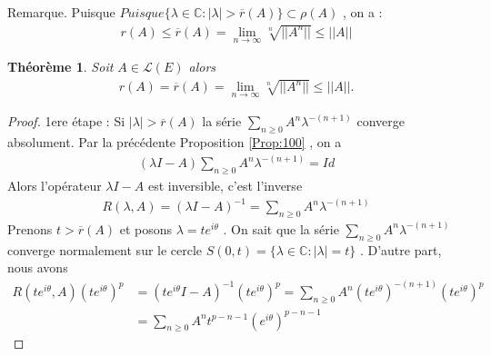 \documentclass{report}
\newtheorem{The}{Théorème}[subsection]
\begin{document}
{Remarque. Puisque $Puisque \{\lambda \in \mathbb{C} : |\lambda| > \overline{r}(A)\} \subset \rho(A)$ , on a : 
					\begin{align*}
								 r(A) \le \overline{r}(A) = \lim_{n\to \infty} \sqrt[n]{||A^n||} \le ||A|| 
					\end{align*}



\begin{The} Soit $A \in \mathscr{L}(E)$ alors 
					\begin{align*}
							 r(A) = \overline{r}(A) = \lim_{n\to \infty} \sqrt[n]{||A^n||} \le ||A|| .
					\end{align*}
\end{The}
\begin{proof}
1ere étape : Si $|\lambda| > \overline{r}(A)$ la série $\sum_{n\ge 0} A^n \lambda^{-(n+1)}$ converge absolument. Par la précédente Proposition \ref{Prop:100} , on a 
					\begin{align*}
								 (\lambda I - A) \sum_{n\ge 0} A^n \lambda^{-(n+1)} = Id 
					\end{align*}
	Alors l'opérateur $\lambda I - A$ est inversible, c'est l'inverse 
					\begin{align*}
								 R(\lambda, A) = (\lambda I - A)^{-1} = \sum_{n\ge 0} A^n \lambda^{-(n+1)} 
					\end{align*}
	Prenons $t > \overline{r}(A)$ et posons $\lambda = t e^{i \theta}$ . On sait que la série $\sum_{n\ge 0} A^n \lambda^{-(n+1)}$ converge normalement sur le cercle $S(0,t) = \{\lambda \in \mathbb{C} : |\lambda| = t\}$ . D'autre part, nous avons 
					\begin{align*}
								 R(t e^{i \theta}, A)(t e^{i \theta})^p &= (t e^{i \theta} I - A)^{-1} (t e^{i \theta})^p = \sum_{n\ge 0} A^n (t e^{i \theta})^{-(n+1)} (t e^{i \theta})^p \\
								 &= \sum_{n\ge 0} A^n t^{p-n-1} (e^{i \theta})^{p-n-1} 
					\end{align*}




\end{proof}}
\end{document}
